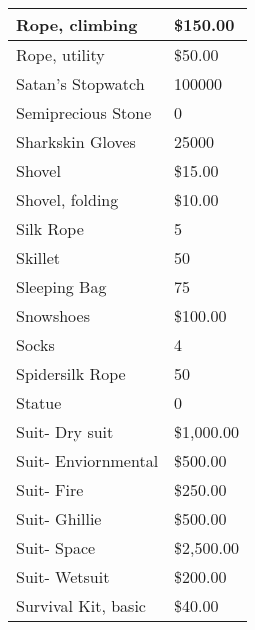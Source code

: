 \documentclass[twoside]{book}
\begin{document}
\begin{longtable}{p{1.25in}l}
  \raggedright
           Rope, climbing 
  &
   \$150.00 
  \tabularnewline
  \hline
      
  \raggedright
           Rope, utility 
  &
   \$50.00 
  \tabularnewline
  \hline
      
  \raggedright
           Satan's Stopwatch 
  &
   100000 
  \tabularnewline
  \hline
      
  \raggedright
           Semiprecious Stone 
  &
   0 
  \tabularnewline
  \hline
      
  \raggedright
           Sharkskin Gloves 
  &
   25000 
  \tabularnewline
  \hline
      
  \raggedright
           Shovel 
  &
   \$15.00 
  \tabularnewline
  \hline
      
  \raggedright
           Shovel, folding 
  &
   \$10.00 
  \tabularnewline
  \hline
      
  \raggedright
           Silk Rope 
  &
   5 
  \tabularnewline
  \hline
      
  \raggedright
           Skillet 
  &
   50 
  \tabularnewline
  \hline
      
  \raggedright
           Sleeping Bag 
  &
   75 
  \tabularnewline
  \hline
      
  \raggedright
           Snowshoes 
  &
   \$100.00 
  \tabularnewline
  \hline
      
  \raggedright
           Socks 
  &
   4 
  \tabularnewline
  \hline
      
  \raggedright
           Spidersilk Rope 
  &
   50 
  \tabularnewline
  \hline
      
  \raggedright
           Statue 
  &
   0 
  \tabularnewline
  \hline
      
  \raggedright
           Suit- Dry suit 
  &
   \$1,000.00 
  \tabularnewline
  \hline
      
  \raggedright
           Suit- Enviornmental 
  &
   \$500.00 
  \tabularnewline
  \hline
      
  \raggedright
           Suit- Fire 
  &
   \$250.00 
  \tabularnewline
  \hline
      
  \raggedright
           Suit- Ghillie 
  &
   \$500.00 
  \tabularnewline
  \hline
      
  \raggedright
           Suit- Space 
  &
   \$2,500.00 
  \tabularnewline
  \hline
      
  \raggedright
           Suit- Wetsuit 
  &
   \$200.00 
  \tabularnewline
  \hline
      
  \raggedright
           Survival Kit, basic 
  &
   \$40.00 
  \tabularnewline
  \hline
      

\end{longtable}
\end{document}
